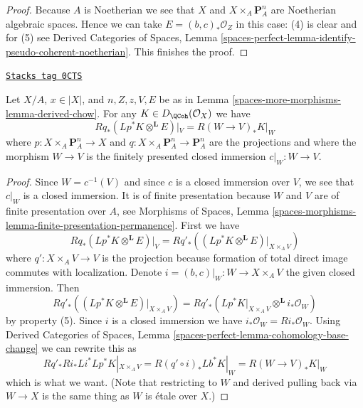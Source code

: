 \begin{proof}
\medskip\noindent
Because $A$ is Noetherian we see that $X$ and $X \times_A \mathbf{P}^n_A$
are Noetherian algebraic spaces. Hence we can take $E = (b, c)_*\mathcal{O}_Z$
in this case: (4) is clear and for (5) see
Derived Categories of Spaces, Lemma
\ref{spaces-perfect-lemma-identify-pseudo-coherent-noetherian}.
This finishes the proof.
\end{proof}

\begin{lemma}
\label{spaces-more-morphisms-lemma-compute-Fourier-Mukai-for-derived-chow}
\href{https://stacks.math.columbia.edu/tag/0CTS}{\texttt{Stacks tag 0CTS}}

Let $X/A$, $x \in |X|$, and
$n, Z, z, V, E$ be as in Lemma \ref{spaces-more-morphisms-lemma-derived-chow}.
For any $K \in D_\QCoh(\mathcal{O}_X)$ we have
$$
Rq_*(Lp^*K \otimes^\mathbf{L} E)|_V = R(W \to V)_*K|_W
$$
where $p : X \times_A \mathbf{P}^n_A \to X$ and
$q : X \times_A \mathbf{P}^n_A \to \mathbf{P}^n_A$ are
the projections and where the morphism $W \to V$ is
the finitely presented closed immersion $c|_W : W \to V$.
\end{lemma}

\begin{proof}
Since $W = c^{-1}(V)$ and since $c$ is a closed immersion
over $V$, we see that $c|_W$ is a closed immersion.
It is of finite presentation because $W$ and $V$ are of finite
presentation over $A$, see
Morphisms of Spaces, Lemma
\ref{spaces-morphisms-lemma-finite-presentation-permanence}.
First we have
$$
Rq_*(Lp^*K \otimes^\mathbf{L} E)|_V =
Rq'_*\left((Lp^*K \otimes^\mathbf{L} E)|_{X \times_A V}\right)
$$
where $q' : X \times_A V \to V$ is the projection because
formation of total direct image commutes with localization.
Denote $i = (b, c)|_W : W \to X \times_A V$ the given closed immersion.
Then
$$
Rq'_*\left((Lp^*K \otimes^\mathbf{L} E)|_{X \times_A V}\right) =
Rq'_*(Lp^*K|_{X \times_A V} \otimes^\mathbf{L} i_*\mathcal{O}_W)
$$
by property (5). Since $i$ is a closed immersion we have
$i_*\mathcal{O}_W = Ri_*\mathcal{O}_W$.
Using
Derived Categories of Spaces,
Lemma \ref{spaces-perfect-lemma-cohomology-base-change}
we can rewrite this as
$$
Rq'_* Ri_* Li^* Lp^*K|_{X \times_A V} =
R(q' \circ i)_* Lb^*K|_W =
R(W \to V)_* K|_W
$$
which is what we want. (Note that restricting to $W$
and derived pulling back via $W \to X$ is the same thing
as $W$ is \'etale over $X$.)
\end{proof}

